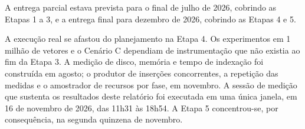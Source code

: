 \vspace{0.6em}

A entrega parcial estava prevista para o final de julho de 2026, cobrindo as Etapas 1 a 3, e a entrega final para dezembro de 2026, cobrindo as Etapas 4 e 5.

A execução real se afastou do planejamento na Etapa 4. Os experimentos em 1 milhão de vetores e o Cenário C dependiam de instrumentação que não existia ao fim da Etapa 3. A medição de disco, memória e tempo de indexação foi construída em agosto; o produtor de inserções concorrentes, a repetição das medidas e o amostrador de recursos por fase, em novembro. A sessão de medição que sustenta os resultados deste relatório foi executada em uma única janela, em 16 de novembro de 2026, das 11h31 às 18h54. A Etapa 5 concentrou-se, por consequência, na segunda quinzena de novembro.
